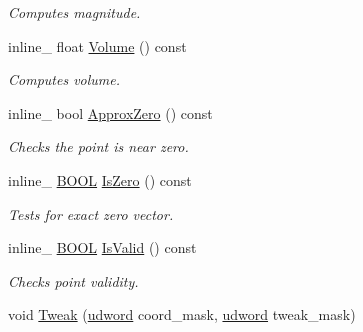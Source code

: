 \begin{DoxyCompactItemize}
\begin{DoxyCompactList}\small\item\em Computes magnitude. \end{DoxyCompactList}\item 
\hypertarget{class_point_ab9c444ad1d9d30ccc7c7c9c4a8437f27}{inline\+\_\+ float \hyperlink{class_point_ab9c444ad1d9d30ccc7c7c9c4a8437f27}{Volume} () const }\label{class_point_ab9c444ad1d9d30ccc7c7c9c4a8437f27}

\begin{DoxyCompactList}\small\item\em Computes volume. \end{DoxyCompactList}\item 
\hypertarget{class_point_a484b9d912521bc2a322115d476dab955}{inline\+\_\+ bool \hyperlink{class_point_a484b9d912521bc2a322115d476dab955}{Approx\+Zero} () const }\label{class_point_a484b9d912521bc2a322115d476dab955}

\begin{DoxyCompactList}\small\item\em Checks the point is near zero. \end{DoxyCompactList}\item 
\hypertarget{class_point_a8d3b031bb8f14fbb57042e3a12444df9}{inline\+\_\+ \hyperlink{_ice_types_8h_a050c65e107f0c828f856a231f4b4e788}{B\+O\+O\+L} \hyperlink{class_point_a8d3b031bb8f14fbb57042e3a12444df9}{Is\+Zero} () const }\label{class_point_a8d3b031bb8f14fbb57042e3a12444df9}

\begin{DoxyCompactList}\small\item\em Tests for exact zero vector. \end{DoxyCompactList}\item 
\hypertarget{class_point_a291c9aa03be755432716d9c18efea22f}{inline\+\_\+ \hyperlink{_ice_types_8h_a050c65e107f0c828f856a231f4b4e788}{B\+O\+O\+L} \hyperlink{class_point_a291c9aa03be755432716d9c18efea22f}{Is\+Valid} () const }\label{class_point_a291c9aa03be755432716d9c18efea22f}

\begin{DoxyCompactList}\small\item\em Checks point validity. \end{DoxyCompactList}\item 
\hypertarget{class_point_af2dc20d8d8909d011c9617dae274cfa7}{void \hyperlink{class_point_af2dc20d8d8909d011c9617dae274cfa7}{Tweak} (\hyperlink{_ice_types_8h_a44c6f1920ba5551225fb534f9d1a1733}{udword} coord\+\_\+mask, \hyperlink{_ice_types_8h_a44c6f1920ba5551225fb534f9d1a1733}{udword} tweak\+\_\+mask)}\label{class_point_af2dc20d8d8909d011c9617dae274cfa7}


\end{DoxyCompactItemize}
